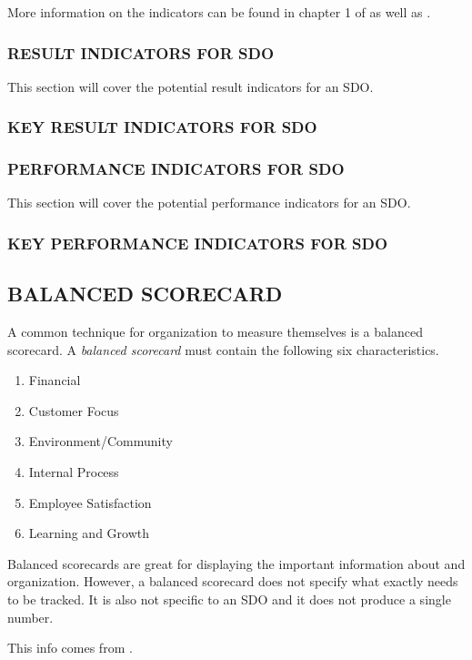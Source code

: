 \documentclass[SDSUThesis.tex]{subfiles}
\begin{document}
More information on the indicators can be found
in chapter 1 of \cite{parmenter2010}
as well as \cite{florac1999,kaplan1992}.

\subsubsection{RESULT INDICATORS FOR SDO}
    This section will cover the potential result indicators for an SDO.
    
\subsubsection{KEY RESULT INDICATORS FOR SDO}


\subsubsection{PERFORMANCE INDICATORS FOR SDO}
    This section will cover the potential performance indicators for an SDO.
    
    
\subsubsection{KEY PERFORMANCE INDICATORS FOR SDO}
    

\subsection{BALANCED SCORECARD}

A common technique for organization to measure themselves is a balanced scorecard.
A \textit{balanced scorecard} must contain the following six
characteristics.
\begin{enumerate}
  \item Financial 
  \item Customer Focus
  \item Environment/Community
  \item Internal Process
  \item Employee Satisfaction
  \item Learning and Growth
\end{enumerate}

Balanced scorecards are great for displaying the important information about
and organization.  However, a balanced scorecard does not specify what
exactly needs to be tracked.  It is also not specific to an SDO and 
it does not produce a single number.

This info comes from \cite{parmenter2010}.
\end{document}
